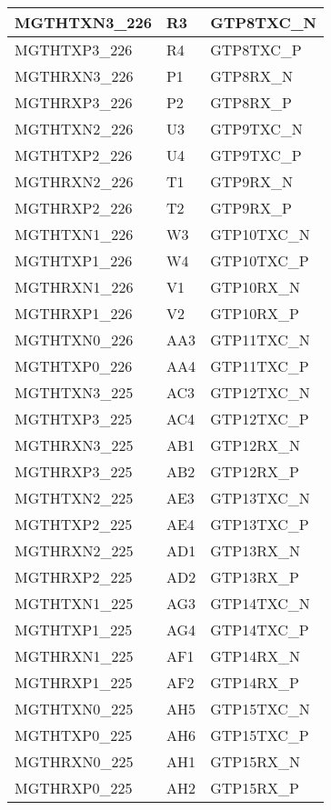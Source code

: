 \begin{footnotesize}
\begin{longtable}{|p{7cm}|p{1cm}|p{5cm}|}
MGTHTXN3\_226	&	R3	&	GTP8TXC\_N	\\ \hline
MGTHTXP3\_226	&	R4	&	GTP8TXC\_P	\\ \hline
MGTHRXN3\_226	&	P1	&	GTP8RX\_N	\\ \hline
MGTHRXP3\_226	&	P2	&	GTP8RX\_P	\\ \hline
MGTHTXN2\_226	&	U3	&	GTP9TXC\_N	\\ \hline
MGTHTXP2\_226	&	U4	&	GTP9TXC\_P	\\ \hline
MGTHRXN2\_226	&	T1	&	GTP9RX\_N	\\ \hline
MGTHRXP2\_226	&	T2	&	GTP9RX\_P	\\ \hline
MGTHTXN1\_226	&	W3	&	GTP10TXC\_N	\\ \hline
MGTHTXP1\_226	&	W4	&	GTP10TXC\_P	\\ \hline
MGTHRXN1\_226	&	V1	&	GTP10RX\_N	\\ \hline
MGTHRXP1\_226	&	V2	&	GTP10RX\_P	\\ \hline
MGTHTXN0\_226	&	AA3	&	GTP11TXC\_N	\\ \hline
MGTHTXP0\_226	&	AA4	&	GTP11TXC\_P	\\ \hline

MGTHTXN3\_225	&	AC3	&	GTP12TXC\_N	\\ \hline
MGTHTXP3\_225	&	AC4	&	GTP12TXC\_P	\\ \hline
MGTHRXN3\_225	&	AB1	&	GTP12RX\_N	\\ \hline
MGTHRXP3\_225	&	AB2	&	GTP12RX\_P	\\ \hline
MGTHTXN2\_225	&	AE3	&	GTP13TXC\_N	\\ \hline
MGTHTXP2\_225	&	AE4	&	GTP13TXC\_P	\\ \hline
MGTHRXN2\_225	&	AD1	&	GTP13RX\_N	\\ \hline
MGTHRXP2\_225	&	AD2	&	GTP13RX\_P	\\ \hline
MGTHTXN1\_225	&	AG3	&	GTP14TXC\_N	\\ \hline
MGTHTXP1\_225	&	AG4	&	GTP14TXC\_P	\\ \hline
MGTHRXN1\_225	&	AF1	&	GTP14RX\_N	\\ \hline
MGTHRXP1\_225	&	AF2	&	GTP14RX\_P	\\ \hline

MGTHTXN0\_225	&	AH5	&	GTP15TXC\_N	\\ \hline
MGTHTXP0\_225	&	AH6	&	GTP15TXC\_P	\\ \hline
MGTHRXN0\_225	&	AH1	&	GTP15RX\_N	\\ \hline
MGTHRXP0\_225	&	AH2	&	GTP15RX\_P	\\ \hline

		
	\end{longtable}
\end{footnotesize}
